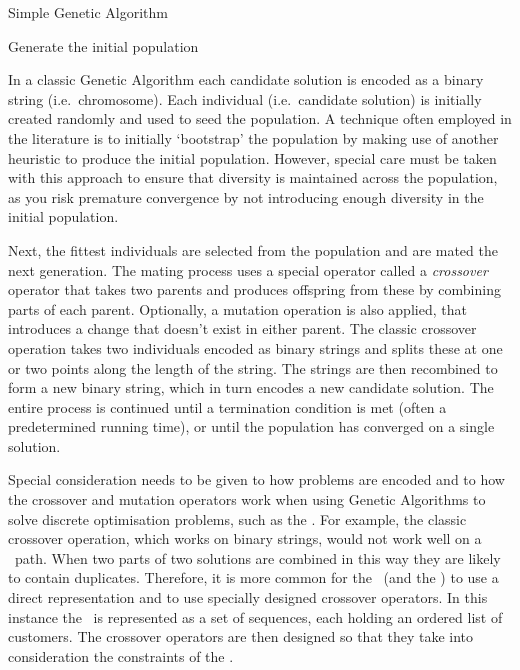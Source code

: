 \begin{algorithm}[H]
   \caption{Simple Genetic Algorithm}
   Generate the initial population\\
\end{algorithm}

In a classic Genetic Algorithm each candidate solution is encoded as a binary string (i.e.~chromosome). Each individual (i.e.~candidate solution) is initially created randomly and used to seed the population. A technique often employed in the literature is to initially `bootstrap' the population by making use of another heuristic to produce the initial population. However, special care must be taken with this approach to ensure that diversity is maintained across the population, as you risk premature convergence by not introducing enough diversity in the initial population. 

Next, the fittest individuals are selected from the population and are mated the next generation. The mating process uses a special operator called a \emph{crossover} operator that takes two parents and produces offspring from these by combining parts of each parent. Optionally, a mutation operation is also applied, that introduces a change that doesn't exist in either parent. The classic crossover operation takes two individuals encoded as binary strings and splits these at one or two points along the length of the string. The strings are then recombined to form a new binary string, which in turn encodes a new candidate solution. The entire process is continued until a termination condition is met (often a predetermined running time), or until the population has converged on a single solution.

Special consideration needs to be given to how problems are encoded and to how the crossover and mutation operators work when using Genetic Algorithms to solve discrete optimisation problems, such as the \VRP. For example, the classic crossover operation, which works on binary strings, would not work well on a \TSP\ path. When two parts of two solutions are combined in this way they are likely to contain duplicates. Therefore, it is more common for the \VRP\ (and the \TSP) to use a direct representation and to use specially designed crossover operators. In this instance the \VRP\ is represented as a set of sequences, each holding an ordered list of customers. The crossover operators are then designed so that they take into consideration the constraints of the \VRP.

